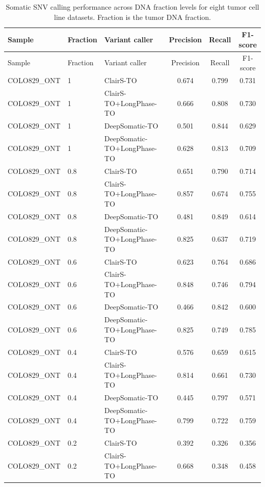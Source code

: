\documentclass[pdflatex,sn-nature]{sn-jnl}
\begin{document}
\FloatBarrier
{\small
\begin{longtable}{@{}lllccc@{}}
  \caption[Somatic SNV calling performance across DNA fraction levels]%
  {Somatic SNV calling performance across DNA fraction levels for eight tumor cell line
  datasets. Fraction is the tumor DNA fraction.}
  \label{tab:somatic_purity}\\
  \toprule
  Sample & Fraction & Variant caller & Precision & Recall & F1-score \\
  \midrule
  \endfirsthead
  \toprule
  Sample & Fraction & Variant caller & Precision & Recall & F1-score \\
  \midrule
  \endhead
  \bottomrule
  \endlastfoot
  COLO829\_ONT & 1 & ClairS-TO & 0.674 & 0.799 & 0.731 \\
  COLO829\_ONT & 1 & ClairS-TO+LongPhase-TO & 0.666 & 0.808 & 0.730 \\
  COLO829\_ONT & 1 & DeepSomatic-TO & 0.501 & 0.844 & 0.629 \\
  COLO829\_ONT & 1 & DeepSomatic-TO+LongPhase-TO & 0.628 & 0.813 & 0.709 \\
  COLO829\_ONT & 0.8 & ClairS-TO & 0.651 & 0.790 & 0.714 \\
  COLO829\_ONT & 0.8 & ClairS-TO+LongPhase-TO & 0.857 & 0.674 & 0.755 \\
  COLO829\_ONT & 0.8 & DeepSomatic-TO & 0.481 & 0.849 & 0.614 \\
  COLO829\_ONT & 0.8 & DeepSomatic-TO+LongPhase-TO & 0.825 & 0.637 & 0.719 \\
  COLO829\_ONT & 0.6 & ClairS-TO & 0.623 & 0.764 & 0.686 \\
  COLO829\_ONT & 0.6 & ClairS-TO+LongPhase-TO & 0.848 & 0.746 & 0.794 \\
  COLO829\_ONT & 0.6 & DeepSomatic-TO & 0.466 & 0.842 & 0.600 \\
  COLO829\_ONT & 0.6 & DeepSomatic-TO+LongPhase-TO & 0.825 & 0.749 & 0.785 \\
  COLO829\_ONT & 0.4 & ClairS-TO & 0.576 & 0.659 & 0.615 \\
  COLO829\_ONT & 0.4 & ClairS-TO+LongPhase-TO & 0.814 & 0.661 & 0.730 \\
  COLO829\_ONT & 0.4 & DeepSomatic-TO & 0.445 & 0.797 & 0.571 \\
  COLO829\_ONT & 0.4 & DeepSomatic-TO+LongPhase-TO & 0.799 & 0.722 & 0.759 \\
  COLO829\_ONT & 0.2 & ClairS-TO & 0.392 & 0.326 & 0.356 \\
  COLO829\_ONT & 0.2 & ClairS-TO+LongPhase-TO & 0.668 & 0.348 & 0.458 \\

\end{longtable}}
\end{document}
